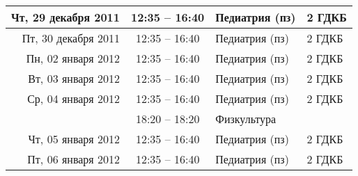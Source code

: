 \documentclass[a4paper,10pt,notitlepage]{report}
\begin{document}
\begin{center}
{\begin{longtable}{r|c|l|l|}
\hline Чт, 29 декабря 2011
  & 12:35 -- 16:40 & Педиатрия (пз) & 2 ГДКБ \\ \cline{2-4}
\hline Пт, 30 декабря 2011
  & 12:35 -- 16:40 & Педиатрия (пз) & 2 ГДКБ \\ \cline{2-4}
\hline Пн, 02 января 2012
  & 12:35 -- 16:40 & Педиатрия (пз) & 2 ГДКБ \\ \cline{2-4}
\hline Вт, 03 января 2012
  & 12:35 -- 16:40 & Педиатрия (пз) & 2 ГДКБ \\ \cline{2-4}
\hline Ср, 04 января 2012
  & 12:35 -- 16:40 & Педиатрия (пз) & 2 ГДКБ \\ \cline{2-4}
  & 18:20 -- 18:20 & Физкультура  &  \\ \cline{2-4}
\hline Чт, 05 января 2012
  & 12:35 -- 16:40 & Педиатрия (пз) & 2 ГДКБ \\ \cline{2-4}
\hline Пт, 06 января 2012
  & 12:35 -- 16:40 & Педиатрия (пз) & 2 ГДКБ \\ \cline{2-4}

\end{longtable}
}
\end{center}
\end{document}

